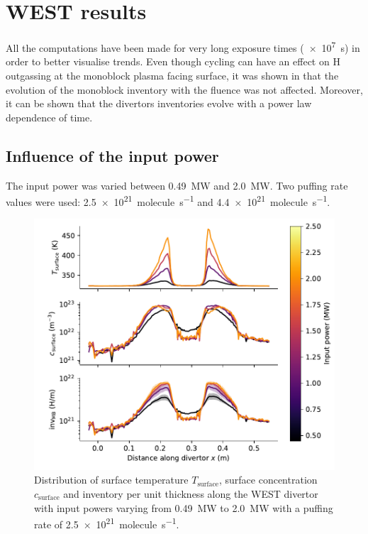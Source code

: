\section{WEST results}

All the computations have been made for very long exposure times (\SI{e7}{s}) in order to better visualise trends.
Even though cycling can have an effect on H outgassing at the monoblock plasma facing surface, it was shown in  that the evolution of the monoblock inventory with the fluence was not affected.
Moreover, it can be shown that the divertors inventories evolve with a power law dependence of time.

\subsection{Influence of the input power}

The input power was varied between \SI{0.49}{MW} and \SI{2.0}{MW}.
Two puffing rate values were used: \SI{2.5e21}{molecule.s^{-1}} and \SI{4.4e21}{molecule.s^{-1}}.

\begin{figure}[h]
    \centering
    \includegraphics[width=\linewidth]{Figures/Chapter4/WEST/inventory_along_divertor_input_power.pdf}
    \caption{Distribution of surface temperature $T_\mathrm{surface}$, surface concentration $c_\mathrm{surface}$ and inventory per unit thickness along the WEST divertor with input powers varying from \SI{0.49}{MW} to \SI{2.0}{MW} with a puffing rate of \SI{2.5e21}{molecule.s^{-1}}.}
\end{figure}

